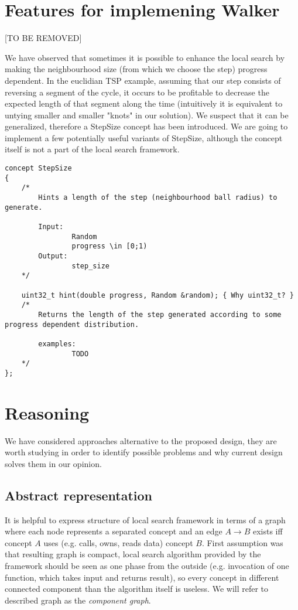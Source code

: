 \section{Features for implemening Walker}
[TO BE REMOVED]

We have observed that sometimes it is possible to enhance the local search
by making the neighbourhood size (from which we choose the step) progress dependent.
In the euclidian TSP example, assuming that our step consists of reversing a segment of the cycle,
it occurs to be profitable to decrease the expected length of that segment along the time
(intuitively it is equivalent to untying smaller and smaller "knots" in our solution).
We suspect that it can be generalized, therefore a StepSize concept has been introduced.
We are going to implement a few potentially useful variants of StepSize,
although the concept itself is not a part of the local search framework.

\begin{lstlisting}
concept StepSize
{
	/*
		Hints a length of the step (neighbourhood ball radius) to generate.

		Input:
				Random
				progress \in [0;1)
		Output:
				step_size
	*/

	uint32_t hint(double progress, Random &random); { Why uint32_t? }
	/*
		Returns the length of the step generated according to some progress dependent distribution.

		examples:
				TODO
	*/
};
\end{lstlisting}

\section{Reasoning}

We have considered approaches alternative to the proposed design, they are
worth studying in order to identify possible problems and why current design
solves them in our opinion.

\subsection{Abstract representation}
It is helpful to express structure of local search framework in terms of a
graph where each node represents a separated concept and an edge $A \to B$
exists iff concept $A$ uses (e.g. calls, owns, reads data) concept $B$. First
assumption was that resulting graph is compact, local search algorithm provided
by the framework should be seen as one phase from the outside (e.g. invocation
of one function, which takes input and returns result), so every concept in
different connected component than the algorithm itself is useless. We will
refer to described graph as the \emph{component graph}.

